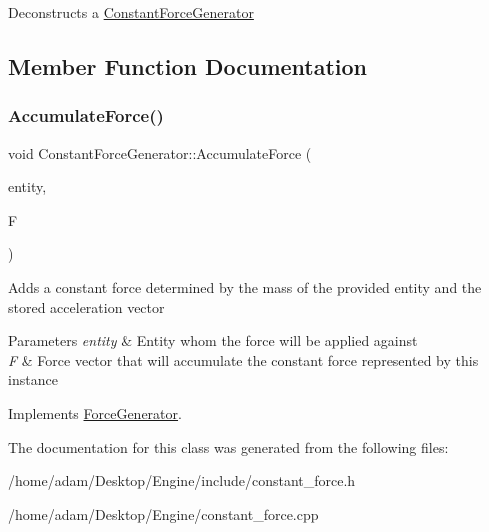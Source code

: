 Deconstructs a \hyperlink{classConstantForceGenerator}{Constant\+Force\+Generator} 

\subsection{Member Function Documentation}
\mbox{\label{classConstantForceGenerator_a6a50c67567de9d26073a373aed77d29f}} 
\subsubsection{\texorpdfstring{Accumulate\+Force()}{AccumulateForce()}}
{\footnotesize\ttfamily void Constant\+Force\+Generator\+::\+Accumulate\+Force (\begin{DoxyParamCaption}\item[{std\+::shared\+\_\+ptr$<$ \hyperlink{classPhysicsEntity}{Physics\+Entity} $>$}]{entity,  }\item[{Vector3\+Gf \&}]{F }\end{DoxyParamCaption})\hspace{0.3cm}{\ttfamily [virtual]}}

Adds a constant force determined by the mass of the provided entity and the stored acceleration vector 
\begin{DoxyParams}{Parameters}
{\em entity} & Entity whom the force will be applied against \\
\hline
{\em F} & Force vector that will accumulate the constant force represented by this instance \\
\hline
\end{DoxyParams}


Implements \hyperlink{classForceGenerator_a96cae0febb1fa8a0bb017aba7b82dbe8}{Force\+Generator}.



The documentation for this class was generated from the following files\+:\begin{DoxyCompactItemize}
\item 
/home/adam/\+Desktop/\+Engine/include/constant\+\_\+force.\+h\item 
/home/adam/\+Desktop/\+Engine/constant\+\_\+force.\+cpp\end{DoxyCompactItemize}
